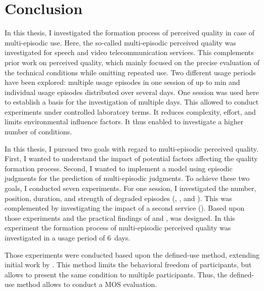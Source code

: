 \chapter{Conclusion}\label{chap:discussion}
In this thesis, I investigated the formation process of perceived quality in case of multi-episodic use.
Here, the so-called multi-episodic perceived quality was investigated for speech and video telecommunication services.
This complements prior work on perceived quality, which mainly focused on the precise evaluation of the technical conditions while omitting repeated use.
Two different usage periods have been explored: multiple usage episodes in one session of up to \unit[45]{min} and individual usage episodes distributed over several days.
One session was used here to establish a basis for the investigation of multiple days.
This allowed to conduct experiments under controlled laboratory terms.
It reduces complexity, effort, and limits environmental influence factors.
It thus enabled to investigate a higher number of conditions.

In this thesis, I pursued two goals with regard to multi-episodic perceived quality.
First, I wanted to understand the impact of potential factors affecting the quality formation process.
Second, I wanted to implement a model using episodic judgments for the prediction of multi-episodic judgments.
To achieve these two goals, I conducted seven experiments.
For one session, I investigated the number, position, duration, and strength of degraded episodes (, \EIIa{}, and ).
This was complemented by investigating the impact of a second service (\EIIb{}).
Based upon those experiments and the practical findings of  and ,  was designed.
In this experiment the formation process of multi-episodic perceived quality was investigated in a usage period of 6~days.

Those experiments were conducted based upon the defined-use method, extending initial work by \citet{moller_single-call_2011}.
This method limits the behavioral freedom of participants, but allows to present the same condition to multiple participants.
Thus, the defined-use method allows to conduct a \ac{MOS} evaluation.

